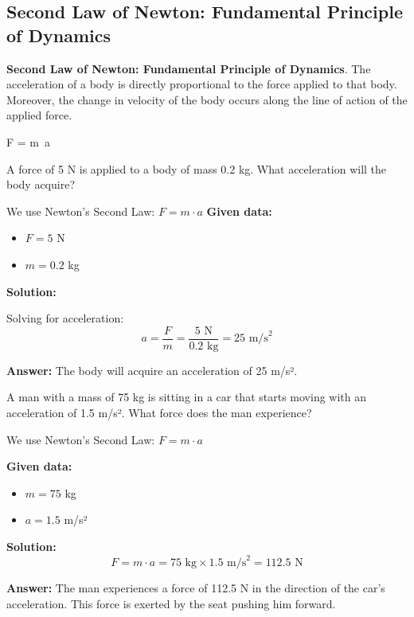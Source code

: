 \subsection{Second Law of Newton: Fundamental Principle of Dynamics}

\begin{dBox}
    \textbf{Second Law of Newton: Fundamental Principle of Dynamics}. The acceleration of a body is directly proportional to the force applied to that body. Moreover, the change in velocity of the body occurs along the line of action of the applied force.
    \begin{centeredequation}
        \Sigma F = m\ a
    \end{centeredequation}
\end{dBox}

\begin{exercise}
    A force of 5 N is applied to a body of mass 0.2 kg.
    What acceleration will the body acquire?

    \begin{solu}
        We use Newton's Second Law: $F = m \cdot a$
        \textbf{Given data:}
        \begin{itemize}
            \item $F = 5$ N
            \item $m = 0.2$ kg
        \end{itemize}

        \textbf{Solution:}

        Solving for acceleration:
        $$a = \frac{F}{m} = \frac{5\text{ N}}{0.2\text{ kg}} = 25\text{ m/s}^2$$

        \textbf{Answer:} The body will acquire an acceleration of 25 m/s².
    \end{solu}
\end{exercise}

\begin{exercise}
    A man with a mass of 75 kg is sitting in a car that starts moving with an acceleration of 1.5 m/s².
    What force does the man experience?

    \begin{solu}
        We use Newton's Second Law: $F = m \cdot a$

        \textbf{Given data:}
        \begin{itemize}
            \item $m = 75$ kg
            \item $a = 1.5$ m/s²
        \end{itemize}

        \textbf{Solution:}
        $$F = m \cdot a = 75\text{ kg} \times 1.5\text{ m/s}^2 = 112.5\text{ N}$$

        \textbf{Answer:} The man experiences a force of 112.5 N in the direction of the car's acceleration. This force is exerted by the seat pushing him forward.
    \end{solu}
\end{exercise}


